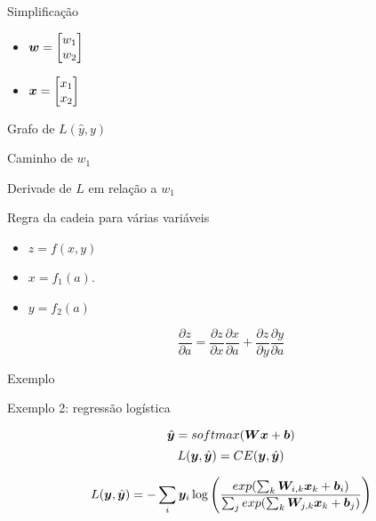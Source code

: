 \documentclass[10pt]{beamer}
\begin{document}
\begin{frame}{Simplificação}
\Large{
\begin{itemize}
\item $\bm{w} = \begin{bmatrix}w_{1}  \\ w_{2}\end{bmatrix}$

\vspace{0.8cm}

\item $\bm{x} = \begin{bmatrix}x_1 \\ x_2\end{bmatrix}$ 

\end{itemize}
}
\end{frame}



\begin{frame}{Grafo de $L(\hat{y}, y)$}

\end{frame}


\begin{frame}{Caminho de $w_1$}

\end{frame}

\begin{frame}{Derivade de $L$ em relação a $w_1$}

\end{frame}


\begin{frame}{Regra da cadeia para várias variáveis}
\Large{
\begin{itemize}
\item $z = f(x,y)$
\item $x = f_{1}(a)$. 
\item $y = f_{2}(a)$
\end{itemize}
\[
\frac{\partial z}{ \partial a} = \frac{\partial z}{\partial x} \frac{\partial x}{\partial a} + \frac{\partial z}{\partial y} \frac{\partial y}{\partial a} 
\]
}
\end{frame}


\begin{frame}{Exemplo}

\end{frame}

\begin{frame}{Exemplo 2: regressão logística}
\Large{
\begin{equation*}
\hat{\bm{y}} = softmax(\bm{W}\bm{x} + \bm{b})
\end{equation*}
\begin{equation*}
L(\bm{y},\hat{\bm{y}}) = CE(\bm{y},\hat{\bm{y}})
\end{equation*}


\begin{equation*}
L(\bm{y},\hat{\bm{y}}) = - \sum_{i}\bm{y}_{i} \log \left(\frac{exp(\sum_{k} \bm{W}_{i,k}\bm{x}_{k} + \bm{b}_{i})}{\sum_{j}exp(\sum_{k}\bm{W}_{j,k}\bm{x}_{k} + \bm{b}_{j})} \right)
\end{equation*}
}
\end{frame}
\end{document}

